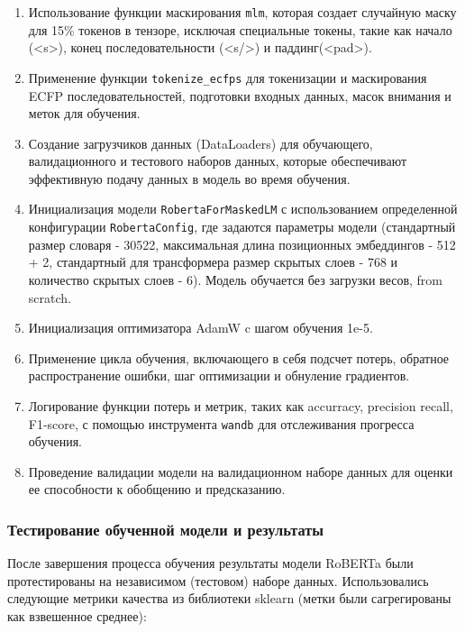 \begin{enumerate}
    \item Использование функции маскирования \texttt{mlm}, которая создает случайную маску для 15\% токенов в тензоре, исключая специальные токены, такие как начало (<s>), конец последовательности (<s/>) и паддинг(<pad>).
    
    \item Применение функции \texttt{tokenize\_ecfps} для токенизации и маскирования ECFP последовательностей, подготовки входных данных, масок внимания и меток для обучения.
    
    \item Создание загрузчиков данных (DataLoaders) для обучающего, валидационного и тестового наборов данных, которые обеспечивают эффективную подачу данных в модель во время обучения.
    
    \item Инициализация модели \texttt{RobertaForMaskedLM} с использованием определенной конфигурации \texttt{RobertaConfig}, где задаются параметры модели (стандартный размер словаря - 30522, максимальная длина позиционных эмбеддингов - 512 + 2, стандартный для трансформера размер скрытых слоев - 768 и количество скрытых слоев - 6). Модель обучается без загрузки весов, from scratch.

    \item Инициализация оптимизатора AdamW \cite{adamw} c шагом обучения 1e-5.
    
    \item Применение цикла обучения, включающего в себя подсчет потерь, обратное распространение ошибки, шаг оптимизации и обнуление градиентов.
    
    \item Логирование функции потерь и метрик, таких как accurracy, precision recall, F1-score, с помощью инструмента \texttt{wandb} \cite{wandb} для отслеживания прогресса обучения.
    
    \item Проведение валидации модели на валидационном наборе данных для оценки ее способности к обобщению и предсказанию.
\end{enumerate}



\subsubsection{Тестирование обученной модели и результаты}
После завершения процесса обучения результаты модели RoBERTa были протестированы на независимом (тестовом) наборе данных. Использовались следующие метрики качества из библиотеки sklearn \cite{sklearn} (метки были сагрегированы как взвешенное среднее):

